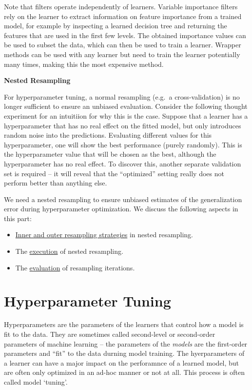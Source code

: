 \documentclass[
]{scrbook}
\providecommand{\tightlist}{%
  \setlength{\itemsep}{0pt}\setlength{\parskip}{0pt}}
\begin{document}
Note that filters operate independently of learners.
Variable importance filters rely on the learner to extract information on feature importance from a trained model, for example by inspecting a learned decision tree and returning the features that are used in the first few levels.
The obtained importance values can be used to subset the data, which can then be used to train a learner.
Wrapper methods can be used with any learner but need to train the learner potentially many times, making this the most expensive method.

\textbf{Nested Resampling}

For hyperparameter tuning, a normal resampling (e.g.~a cross-validation) is no longer sufficient to ensure an unbiased evaluation.
Consider the following thought experiment for an intuitiion for why this is the case.
Suppose that a learner has a hyperparameter that has no real effect on the fitted model, but only introduces random noise into the predictions.
Evaluating different values for this hyperparameter, one will show the best performance (purely randomly).
This is the hyperparameter value that will be chosen as the best, although the hyperparameter has no real effect.
To discover this, another separate validation set is required -- it will reveal that the ``optimized'' setting really does not perform better than anything else.

We need a nested resampling to ensure unbiased estimates of the generalization error during hyperparameter optimization.
We discuss the following aspects in this part:

\begin{itemize}
\tightlist
\item
  \protect\hyperlink{nested-resampling}{Inner and outer resampling strategies} in nested resampling.
\item
  The \protect\hyperlink{nested-resamp-exec}{execution} of nested resampling.
\item
  The \protect\hyperlink{nested-resamp-eval}{evaluation} of resampling iterations.
\end{itemize}

\hypertarget{tuning}{%
\section{Hyperparameter Tuning}\label{tuning}}

Hyperparameters are the parameters of the learners that control how a model is fit to the data.
They are sometimes called second-level or second-order parameters of machine learning -- the parameters of the \emph{models} are the first-order parameters and ``fit'' to the data durning model training.
The hyerparameters of a learner can have a major impact on the perforamnce of a learned model, but are often only optimized in an ad-hoc manner or not at all.
This process is often called model `tuning'.
\end{document}

